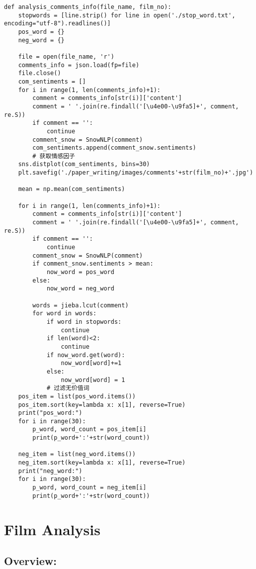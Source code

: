 \documentclass[12pt]{article}
\begin{document}
\lstset{language=Python}
\begin{lstlisting}
def analysis_comments_info(file_name, film_no): 
    stopwords = [line.strip() for line in open('./stop_word.txt', encoding="utf-8").readlines()]
    pos_word = {}
    neg_word = {}

    file = open(file_name, 'r')
    comments_info = json.load(fp=file)
    file.close()
    com_sentiments = []
    for i in range(1, len(comments_info)+1):
        comment = comments_info[str(i)]['content']
        comment = ' '.join(re.findall('[\u4e00-\u9fa5]+', comment, re.S))
        if comment == '':
            continue
        comment_snow = SnowNLP(comment)
        com_sentiments.append(comment_snow.sentiments)
        # 获取情感因子
    sns.distplot(com_sentiments, bins=30)
    plt.savefig('./paper_writing/images/comments'+str(film_no)+'.jpg')

    mean = np.mean(com_sentiments)

    for i in range(1, len(comments_info)+1):
        comment = comments_info[str(i)]['content']
        comment = ' '.join(re.findall('[\u4e00-\u9fa5]+', comment, re.S))
        if comment == '':
            continue
        comment_snow = SnowNLP(comment)
        if comment_snow.sentiments > mean:
            now_word = pos_word
        else:
            now_word = neg_word

        words = jieba.lcut(comment)
        for word in words:
            if word in stopwords:
                continue
            if len(word)<2:
                continue
            if now_word.get(word):
                now_word[word]+=1
            else:
                now_word[word] = 1
            # 过滤无价值词
    pos_item = list(pos_word.items())
    pos_item.sort(key=lambda x: x[1], reverse=True)
    print("pos_word:")
    for i in range(30):
        p_word, word_count = pos_item[i]
        print(p_word+':'+str(word_count))

    neg_item = list(neg_word.items())
    neg_item.sort(key=lambda x: x[1], reverse=True)
    print("neg_word:")
    for i in range(30):
        p_word, word_count = neg_item[i]
        print(p_word+':'+str(word_count))
\end{lstlisting}

\section{Film Analysis}
\subsection{Overview:}
\end{document}
